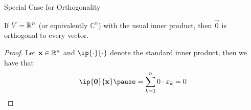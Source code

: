 \documentclass[xcoler=dvipsnames, aspectratio=169]{beamer}
\newcommand{\C}{\mathbb{C}}
\begin{document}
    \begin{frame}{Special Case for Orthogonality}
        \begin{theorem}
            If $V=\mathbb{R}^n$ (or equivalently $\C^n$) with the usual inner product, then $\vec{0}$ is 
            orthogonal to every vector.
        \end{theorem}
        \vspace{50pt}
        \begin{proof}
            Let $\mathbf{x}\in\mathbb{R}^n$ and $\ip{\cdot}{\cdot}$ denote the standard inner product, then
            we have that
            \[
                \ip{\vec{0}}{\vec{x}}\pause = \sum_{k=1}^n 0\cdot x_k = 0
            \]
        \end{proof}
    \end{frame}
\end{document}
